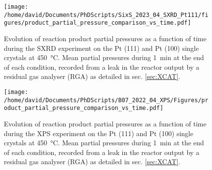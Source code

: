 \begin{figure}[!htb]
    \centering
    \texttt{[image: /home/david/Documents/PhDScripts/SixS\_2023\_04\_SXRD\_Pt111/figures/product\_partial\_pressure\_comparison\_vs\_time.pdf]}
    \caption{
        Evolution of reaction product partial pressures as a function of time during the SXRD experiment on the Pt (111) and Pt (100) single crystals at \qty{450}{\degreeCelsius}.
        Mean partial pressures during \qty{1}{\minute} at the end of each condition, recorded from a leak in the reactor output by a residual gas analyser (RGA) as detailed in sec. \ref{sec:XCAT}.
    }
    \label{fig:RGA450SXRDPt111AndPt100Time}
\end{figure}

\begin{figure}[!htb]
    \centering
    \texttt{[image: /home/david/Documents/PhDScripts/B07\_2022\_04\_XPS/Figures/product\_partial\_pressure\_comparison\_vs\_time.pdf]}
    \caption{
        Evolution of reaction product partial pressures as a function of time during the XPS experiment on the Pt (111) and Pt (100) single crystals at \qty{450}{\degreeCelsius}.
        Mean partial pressures during \qty{1}{\minute} at the end of each condition, recorded from a leak in the reactor output by a residual gas analyser (RGA) as detailed in sec. \ref{sec:XCAT}.
    }
    \label{fig:RGA450XPSPt111AndPt100Time}
\end{figure}

